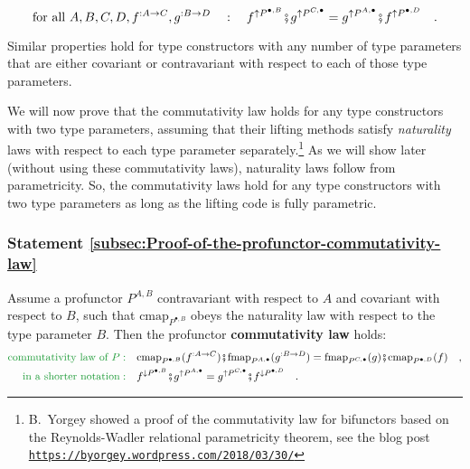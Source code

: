 ~\vspace{-0.5\baselineskip}
\[
\text{for all }A,B,C,D,f^{:A\rightarrow C},g^{:B\rightarrow D}\quad:\quad f^{\uparrow P^{\bullet,B}}\bef g^{\uparrow P^{C,\bullet}}=g^{\uparrow P^{A,\bullet}}\bef f^{\uparrow P^{\bullet,D}}\quad.
\]

Similar properties hold for type constructors with any number of type
parameters that are either covariant or contravariant with respect
to each of those type parameters.

We will now prove that the commutativity law holds for any type constructors
with two type parameters, assuming that their lifting methods satisfy
\emph{naturality} laws with respect to each type parameter separately.\footnote{B.~Yorgey showed a proof of the commutativity law for bifunctors
based on the Reynolds-Wadler relational parametricity theorem, see
the blog post \texttt{\href{https://byorgey.wordpress.com/2018/03/30/}{https://byorgey.wordpress.com/2018/03/30/}} } As we will show later (without using these commutativity laws), naturality
laws follow from parametricity. So, the commutativity laws hold for
any type constructors with two type parameters as long as the lifting
code is fully parametric.

\subsubsection{Statement \label{subsec:Proof-of-the-profunctor-commutativity-law}\ref{subsec:Proof-of-the-profunctor-commutativity-law}}

Assume a profunctor $P^{A,B}$ contravariant with respect to $A$
and covariant with respect to $B$, such that $\text{cmap}_{P^{\bullet,B}}$
obeys the naturality law with respect to the type parameter $B$.
Then the profunctor \textbf{commutativity law}
holds:
\begin{align}
{\color{greenunder}\text{commutativity law of }P:}\quad & \text{cmap}_{P^{\bullet,B}}(f^{:A\rightarrow C})\bef\text{fmap}_{P^{A,\bullet}}(g^{:B\rightarrow D})=\text{fmap}_{P^{C,\bullet}}(g)\bef\text{cmap}_{P^{\bullet,D}}(f)\quad,\nonumber \\
{\color{greenunder}\text{in a shorter notation}:}\quad & f^{\downarrow P^{\bullet,B}}\bef g^{\uparrow P^{A,\bullet}}=g^{\uparrow P^{C,\bullet}}\bef f^{\downarrow P^{\bullet,D}}\quad.\label{eq:profunctor-commutativity-law}
\end{align}

